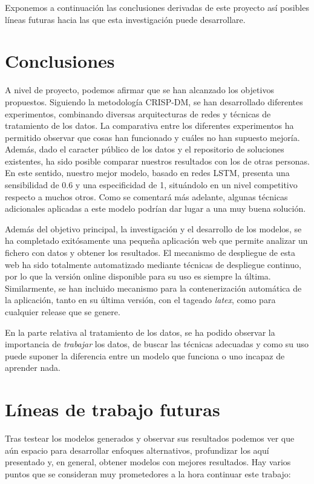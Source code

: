 
Exponemos a continuación las conclusiones derivadas de este proyecto así posibles líneas futuras hacia las que esta investigación puede desarrollare.

\section{Conclusiones}

A nivel de proyecto, podemos afirmar que se han alcanzado los objetivos propuestos. Siguiendo la metodología CRISP-DM, se han desarrollado diferentes experimentos, combinando diversas arquitecturas de redes y técnicas de tratamiento de los datos. La comparativa entre los diferentes experimentos ha permitido observar que cosas han funcionado y cuáles no han supuesto mejoría. Además, dado el caracter público de los datos y el repositorio de soluciones existentes, ha sido posible comparar nuestros resultados con los de otras personas. En este sentido, nuestro mejor modelo, basado en redes LSTM, presenta una sensibilidad de 0.6 y una especificidad de 1, situándolo en un nivel competitivo respecto a muchos otros. Como se comentará más adelante, algunas técnicas adicionales aplicadas a este modelo podrían dar lugar a una muy buena solución.

Además del objetivo principal, la investigación y el desarrollo de los modelos, se ha completado exitósamente una pequeña aplicación web que permite analizar un fichero con datos y obtener los resultados. El mecanismo de despliegue de esta web ha sido totalmente automatizado mediante técnicas de despliegue continuo, por lo que la versión online disponible para su uso es siempre la última. Similarmente, se han incluido mecanismo para la contenerización automática de la aplicación, tanto en su última versión, con el tageado \textit{latex}, como para cualquier release que se genere. 

En la parte relativa al tratamiento de los datos, se ha podido observar la importancia de \textit{trabajar} los datos, de buscar las técnicas adecuadas y como su uso puede suponer la diferencia entre un modelo que funciona o uno incapaz de aprender nada.

\section{Líneas de trabajo futuras}

Tras testear los modelos generados y observar sus resultados podemos ver que aún espacio para desarrollar enfoques alternativos, profundizar los aquí presentado y, en general, obtener modelos con mejores resultados. Hay varios puntos que se consideran muy prometedores a la hora continuar este trabajo:

